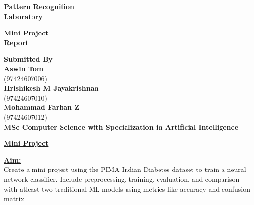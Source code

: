 \documentclass[article,14pt]{extarticle}
\begin{document}
    \thispagestyle{empty}
    \begin{center}
        \Huge \textbf{Pattern Recognition \\ Laboratory}\\
    \end{center}

    \begin{center}
        \LARGE \textbf{Mini Project \\ Report}
        
    \end{center}

    \vfill

    \begin{center}
        \LARGE \textbf{Submitted By}\\
        \vspace{0.1em}
        \large \textbf{Aswin Tom}\\
        \large (97424607006)\\
        \vspace{0.4em}
        \large \textbf{Hrishikesh M Jayakrishnan}\\
        \large (97424607010)\\
        \vspace{0.4em}
        \large \textbf{Mohammad Farhan Z}\\
        \large (97424607012)\\
        \vspace{0.4em}
        \large \textbf{MSc Computer Science with Specialization in Artificial Intelligence}\\
    \end{center}


    \newpage


    \begin{center}
        \textbf{\underline{Mini Project}}

    \end{center}

    \noindent
    \textbf{\underline{Aim:}}
    \vspace{0.5em}\\
    Create a mini project using the PIMA Indian Diabetes dataset to train a neural network classifier. Include preprocessing, training, evaluation, and comparison with atleast two traditional ML models using metrics like accuracy and confusion matrix
\end{document}
